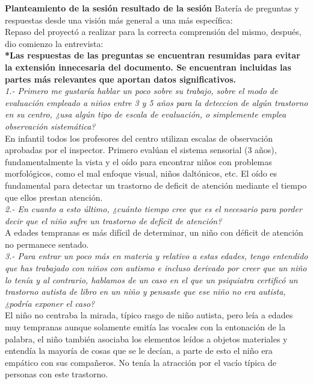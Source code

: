 \documentclass[letterpaper,12pt]{article}
\begin{document}
\textbf{Planteamiento de la sesión resultado de la sesión}
Batería de preguntas y respuestas desde una visión más general a una más
específica: \\
Repaso del proyectó a realizar para la correcta comprensión del mismo,
después, dio comienzo la entrevista: \\
	
	\textbf{*Las respuestas de las preguntas se encuentran resumidas para
evitar la extensión innecesaria del documento. Se encuentran
incluidas las partes más relevantes que aportan datos
significativos.} \\

\textit{1.- Primero me gustaría hablar un poco sobre su trabajo, sobre el modo de evaluación empleado a niños entre 3 y 5 años para la deteccion de algún
trastorno en su centro, ¿usa algún tipo de escala de evaluación, o
simplemente emplea observación sistemática?}\\

En infantil todos los profesores del centro utilizan escalas de observación
aprobadas por el inspector. Primero evalúan el sistema sensorial (3 años),
fundamentalmente la vista y el oído para encontrar niños con problemas
morfológicos, como el mal enfoque visual, niños daltónicos, etc. El oído es
fundamental para detectar un trastorno de deficit de atención mediante el
tiempo que ellos prestan atención.\\

\textit{2.- En cuanto a esto último, ¿cuánto tiempo cree que es el necesario para porder decir que el niño sufre un trastorno de deficit de atención?}\\

A edades tempranas es más difícil de determinar, un niño con déficit de
atención no permanece sentado.\\

\textit{3.- Para entrar un poco más en materia y relativo a estas edades, tengo entendido que has trabajado con niños con autismo e incluso derivado por
creer que un niño lo tenía y al contrario, hablamos de un caso en el que un
psiquiatra certificó un trastorno autista de libro en un niño y pensaste que
ese niño no era autista, ¿podría exponer el caso?}\\

El niño no centraba la mirada, típico rasgo de niño autista, pero leía a edades muy tempranas aunque solamente emitía las vocales con la entonación de la palabra, el niño también asociaba los elementos leídos a objetos materiales
y entendía la mayoría de cosas que se le decían, a parte de esto el niño era
empático con sus compañeros. No tenía la atracción por el vacío típica de
personas con este trastorno.\\
\end{document}
